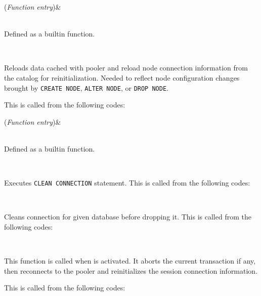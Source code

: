       \FuncRefHdr
		  {(\textit{Function entry})}&{\raggedright {}\\{
				Defined as a builtin function.
		  		}}\\ \hline
      \FuncRefTrailor
  
  
      Reloads data cached with pooler and reload node connection information from the catalog
      for reinitialization.
      Needed to reflect node configuration changes brought by \texttt{CREATE NODE}, \texttt{ALTER NODE},
      or \texttt{DROP NODE}.
      
      This is called from the following codes:
      
      \FuncRefHdr
		  {(\textit{Function entry})}&{\raggedright {}\\{
				Defined as a builtin function.
		  		}}\\ \hline
      \FuncRefTrailor
  
  
      Executes \texttt{CLEAN CONNECTION} statement.
      This is called from the following codes:
      
      \FuncRefHdr
		  \\ \hline
      \FuncRefTrailor
  
  
      Cleans connection for given database before dropping it.
      This is called from the following codes:
      
      \FuncRefHdr
		  \\ \hline
      \FuncRefTrailor
  
  
      This function is called when  is activated.
      It aborts the current transaction if any, then reconnects to the pooler
      and reinitializes the session connection information.
      
      This is called from the following codes:
      
      \FuncRefHdr
		  \\ \hline
      \FuncRefTrailor
  
